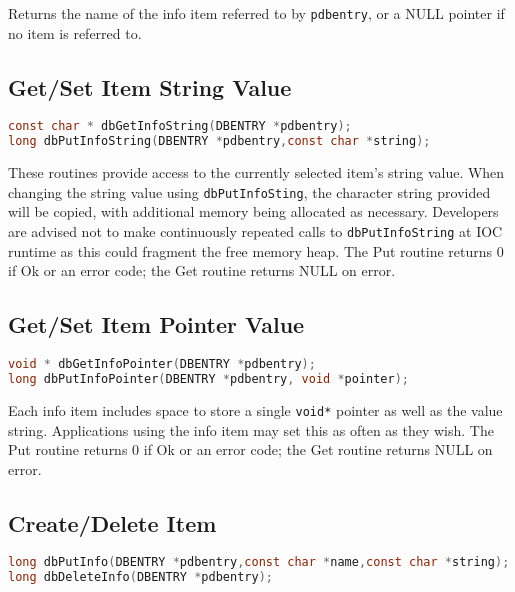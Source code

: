 Returns the name of the info item referred to by \verb|pdbentry|, or a NULL pointer if no item is referred to.

\subsection{Get/Set Item String Value}

\begin{lstlisting}[language=C]
const char * dbGetInfoString(DBENTRY *pdbentry);
long dbPutInfoString(DBENTRY *pdbentry,const char *string);
\end{lstlisting}

These routines provide access to the currently selected item's string value.
When changing the string value using \verb|dbPutInfoSting|, the character string provided will be copied, with additional memory being allocated as necessary.
Developers are advised not to make continuously repeated calls to \verb|dbPutInfoString| at IOC runtime as this could fragment 
the free memory heap.
The Put routine returns 0 if Ok or an error code; the Get routine returns NULL on error.

\subsection{Get/Set Item Pointer Value}

\begin{lstlisting}[language=C]
void * dbGetInfoPointer(DBENTRY *pdbentry);
long dbPutInfoPointer(DBENTRY *pdbentry, void *pointer);
\end{lstlisting}

Each info item includes space to store a single \verb|void*| pointer as well as the value string.
Applications using the info item may set this as often as they wish.
The Put routine returns 0 if Ok or an error code; the Get routine returns NULL on error.

\subsection{Create/Delete Item}

\begin{lstlisting}[language=C]
long dbPutInfo(DBENTRY *pdbentry,const char *name,const char *string);
long dbDeleteInfo(DBENTRY *pdbentry);
\end{lstlisting}

